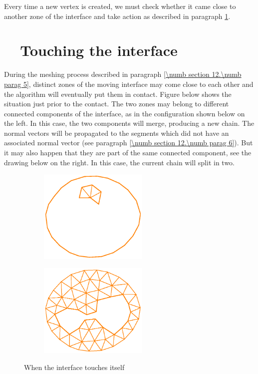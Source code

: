 Every time a new vertex is created, we must check whether it came close to another
zone of the interface and take action as described in paragraph
\ref{\numb section 12.\numb parag 8}.


\section{~~Touching the interface}\label{\numb section 12.\numb parag 8}

During the meshing process described in paragraph \ref{\numb section 12.\numb parag 5},
distinct zones of the moving interface may
come close to each other and the algorithm will eventually put them in contact.
Figure below shows the situation just prior to the contact.
The two zones may belong to different connected components of the interface,
as in the configuration shown below on the left.
In this case, the two components will merge, producing a new chain.
The normal vectors will be propagated to the segments which did not have an associated
normal vector (see paragraph \ref{\numb section 12.\numb parag 6}).
But it may also happen that they are part of the same connected component,
see the drawing below on the right.
In this case, the current chain will split in two.

\begin{figure}[ht] \centering
\begin{subfigure}{65mm}\centering
  \includegraphics[width=52mm]{touching-interf-1}
\end{subfigure}  
\begin{subfigure}{65mm}\centering
  \includegraphics[width=52mm]{touching-interf-2}
\end{subfigure}  
  \caption{When the interface touches itself}
  \label{\numb section 12.\numb fig 6}
\end{figure}

